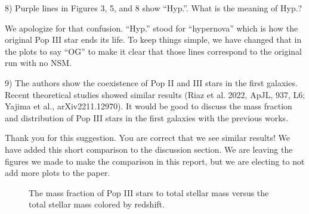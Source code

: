 \documentclass[11pt]{article}
\begin{document}
\begin{tcolorbox}[colback={lightgray}]
    8)      Purple lines in Figures 3, 5, and 8 show “Hyp.”. What is the meaning of Hyp.?
\end{tcolorbox}

We apologize for that confusion. ``Hyp.'' stood for ``hypernova'' which is how the original Pop III star ends its life. To keep things simple, we have changed that in the plots to say ``OG'' to make it clear that those lines correspond to the original run with no NSM.

\begin{tcolorbox}[colback={lightgray}]
    9)      The authors show the coexistence of Pop II and III stars in the first galaxies. Recent theoretical studies showed similar results (Riaz et al. 2022, ApJL, 937, L6; Yajima et al., arXiv2211.12970). It would be good to discuss the mass fraction and distribution of Pop III stars in the first galaxies with the previous works. 
\end{tcolorbox}

Thank you for this suggestion. You are correct that we see similar results! We have added this short comparison to the discussion section. We are leaving the figures we made to make the comparison in this report, but we are electing to not add more plots to the paper.

\begin{figure}[h]
    \centering
    \qquad
    \caption{The mass fraction of Pop III stars to total stellar mass versus the total stellar mass colored by redshift.}%
    \label{fig:ratio}%
\end{figure}
\end{document}
